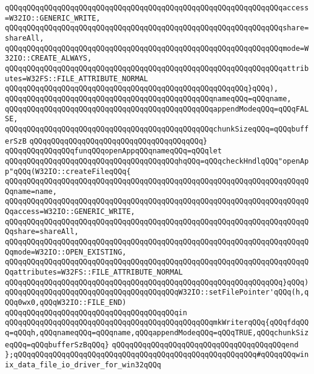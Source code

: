 \verb|qQQqqQQqqQQqqQQqqQQqqQQqqQQqqQQqqQQqqQQqqQQqqQQqqQQqqQQqqQQqqQQqaccess=W32IO::GENERIC_WRITE,|\newline
\verb|qQQqqQQqqQQqqQQqqQQqqQQqqQQqqQQqqQQqqQQqqQQqqQQqqQQqqQQqqQQqqQQqshare=shareAll,|\newline
\verb|qQQqqQQqqQQqqQQqqQQqqQQqqQQqqQQqqQQqqQQqqQQqqQQqqQQqqQQqqQQqqQQqmode=W32IO::CREATE_ALWAYS,|\newline
\verb|qQQqqQQqqQQqqQQqqQQqqQQqqQQqqQQqqQQqqQQqqQQqqQQqqQQqqQQqqQQqqQQqattributes=W32FS::FILE_ATTRIBUTE_NORMAL|\newline
\verb|qQQqqQQqqQQqqQQqqQQqqQQqqQQqqQQqqQQqqQQqqQQqqQQqqQQqqQQq}qQQq),|\newline
\verb|qQQqqQQqqQQqqQQqqQQqqQQqqQQqqQQqqQQqqQQqqQQqqQQqnameqQQq=qQQqname,|\newline
\verb|qQQqqQQqqQQqqQQqqQQqqQQqqQQqqQQqqQQqqQQqqQQqqQQqappendModeqQQq=qQQqFALSE,|\newline
\verb|qQQqqQQqqQQqqQQqqQQqqQQqqQQqqQQqqQQqqQQqqQQqqQQqchunkSizeqQQq=qQQqbufferSzB|\newline
\verb|qQQqqQQqqQQqqQQqqQQqqQQqqQQqqQQqqQQqqQQq}|\newline
\newline
\verb|qQQqqQQqqQQqqQQqfunqQQqopenAppqQQqnameqQQq=qQQqlet|\newline
\verb|qQQqqQQqqQQqqQQqqQQqqQQqqQQqqQQqqQQqqQQqhqQQq=qQQqcheckHndlqQQq"openApp"qQQq(W32IO::createFileqQQq{|\newline
\verb|qQQqqQQqqQQqqQQqqQQqqQQqqQQqqQQqqQQqqQQqqQQqqQQqqQQqqQQqqQQqqQQqqQQqqQQqname=name,|\newline
\verb|qQQqqQQqqQQqqQQqqQQqqQQqqQQqqQQqqQQqqQQqqQQqqQQqqQQqqQQqqQQqqQQqqQQqqQQqaccess=W32IO::GENERIC_WRITE,|\newline
\verb|qQQqqQQqqQQqqQQqqQQqqQQqqQQqqQQqqQQqqQQqqQQqqQQqqQQqqQQqqQQqqQQqqQQqqQQqshare=shareAll,|\newline
\verb|qQQqqQQqqQQqqQQqqQQqqQQqqQQqqQQqqQQqqQQqqQQqqQQqqQQqqQQqqQQqqQQqqQQqqQQqmode=W32IO::OPEN_EXISTING,|\newline
\verb|qQQqqQQqqQQqqQQqqQQqqQQqqQQqqQQqqQQqqQQqqQQqqQQqqQQqqQQqqQQqqQQqqQQqqQQqattributes=W32FS::FILE_ATTRIBUTE_NORMAL|\newline
\verb|qQQqqQQqqQQqqQQqqQQqqQQqqQQqqQQqqQQqqQQqqQQqqQQqqQQqqQQqqQQqqQQq}qQQq)|\newline
\verb|qQQqqQQqqQQqqQQqqQQqqQQqqQQqqQQqqQQqqQQqW32IO::setFilePointer'qQQq(h,qQQq0wx0,qQQqW32IO::FILE_END)|\newline
\verb|qQQqqQQqqQQqqQQqqQQqqQQqqQQqqQQqqQQqqQQqin|\newline
\verb|qQQqqQQqqQQqqQQqqQQqqQQqqQQqqQQqqQQqqQQqqQQqqQQqmkWriterqQQq{qQQqfdqQQq=qQQqh,qQQqnameqQQq=qQQqname,qQQqappendModeqQQq=qQQqTRUE,qQQqchunkSizeqQQq=qQQqbufferSzBqQQq}|\newline
\verb|qQQqqQQqqQQqqQQqqQQqqQQqqQQqqQQqqQQqqQQqend|\newline
\newline
\verb|};qQQqqQQqqQQqqQQqqQQqqQQqqQQqqQQqqQQqqQQqqQQqqQQqqQQqqQQq#qQQqqQQqwinix_data_file_io_driver_for_win32qQQq|\newline
\newline
\newline

